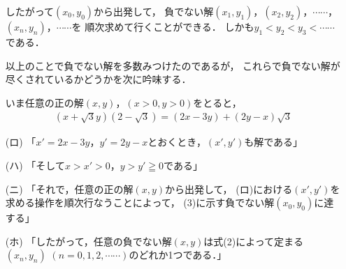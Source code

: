 \documentclass[../../main.tex]{subfiles}
\begin{document}
\begin{enumerate}
    したがって$(x_0,y_0)$から出発して，
    負でない解$(x_1,y_1)$，$(x_2,y_2)$，$\cdots\cdots$，$(x_n,y_n)$，$\cdots\cdots$を
    順次求めて行くことができる．
    しかも$y_1<y_2<y_3<\cdots\cdots$である．

    以上のことで負でない解を多数みつけたのであるが，
    これらで負でない解が尽くされているかどうかを次に吟味する．

    いま任意の正の解$(x,y)$，$(x>0,y>0)$をとると，
    \begin{align*}
      (x+\sqrt3y)(2-\sqrt3)=(2x-3y)+(2y-x)\sqrt3
    \end{align*}
  \item[(ロ)] 「$x'=2x-3y$，$y'=2y-x$とおくとき，$(x',y')$も解である」
  \item[(ハ)] 「そして$x>x'>0$，$y>y'\geqq0$である」
  \item[(ニ)] 「それで，任意の正の解$(x,y)$から出発して，
    (ロ)における$(x',y')$を求める操作を順次行なうことによって，
    (3)に示す負でない解$(x_0,y_0)$に達する」
  \item[(ホ)] 「したがって，任意の負でない解$(x,y)$は式(2)によって定まる
    $(x_n,y_n)$ $(n=0,1,2,\cdots\cdots)$のどれか1つである．」
\end{enumerate}
\end{document}
